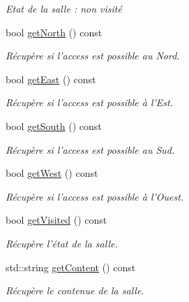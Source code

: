 \begin{DoxyCompactItemize}
\begin{DoxyCompactList}\small\item\em Etat de la salle \-: non visité \end{DoxyCompactList}\item 
bool \hyperlink{class_room_a22f38a4beb5db3140082e23da3da9316}{get\-North} () const 
\begin{DoxyCompactList}\small\item\em Récupère si l'access est possible au Nord. \end{DoxyCompactList}\item 
bool \hyperlink{class_room_a4a5d452b159b419bbd6add72bdbe283b}{get\-East} () const 
\begin{DoxyCompactList}\small\item\em Récupère si l'access est possible à l'Est. \end{DoxyCompactList}\item 
bool \hyperlink{class_room_af329dbe45e8790c559361c7e03f135a7}{get\-South} () const 
\begin{DoxyCompactList}\small\item\em Récupère si l'access est possible au Sud. \end{DoxyCompactList}\item 
bool \hyperlink{class_room_aafd7ca57898b2d8f4123fcd755646987}{get\-West} () const 
\begin{DoxyCompactList}\small\item\em Récupère si l'access est possible à l'Ouest. \end{DoxyCompactList}\item 
bool \hyperlink{class_room_ae653a070a5eb0598097fcbe949e8b483}{get\-Visited} () const 
\begin{DoxyCompactList}\small\item\em Récupère l'état de la salle. \end{DoxyCompactList}\item 
std\-::string \hyperlink{class_room_a6267518113960cc5fbb40936ea9cbc36}{get\-Content} () const 
\begin{DoxyCompactList}\small\item\em Récupère le contenue de la salle. \end{DoxyCompactList}\end{DoxyCompactItemize}
